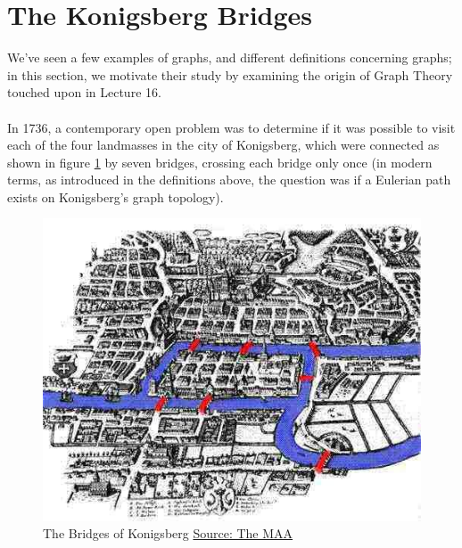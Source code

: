 \documentclass[11pt,reqno]{amsart}
\theoremstyle{definition}
\numberwithin{equation}{section}
\begin{document}
\pagebreak
\section{The Konigsberg Bridges}
\noindent We've seen a few examples of graphs, and different definitions concerning graphs; in this section, we motivate their study by examining the origin of Graph Theory touched upon in Lecture 16. \\
\\
In 1736, a contemporary open problem was to determine if it was possible to visit each of the four landmasses in the city of Konigsberg, which were connected as shown in figure \ref{fig:Konigsberg} by seven bridges, crossing each bridge only once (in modern terms, as introduced in the definitions above, the question was if a Eulerian path exists on Konigsberg's graph topology).
\begin{figure}[h!]
	\centering
	\includegraphics[width=0.4\linewidth]{KonigsbergGraph}
	\caption{The Bridges of Konigsberg	\href{https://www.maa.org/press/periodicals/convergence/leonard-eulers-solution-to-the-konigsberg-bridge-problem}{Source: The MAA}}
	\label{fig:Konigsberg}
\end{figure}
\end{document}
